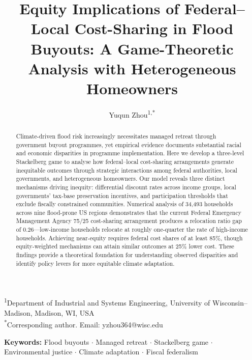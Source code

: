 \documentclass[12pt,a4paper]{article}
\title{\textbf{Equity Implications of Federal--Local Cost-Sharing in Flood Buyouts: A Game-Theoretic Analysis with Heterogeneous Homeowners}}
\author{Yuqun Zhou\textsuperscript{1,*}}
\date{}
\begin{document}
\maketitle

\noindent\textsuperscript{1}Department of Industrial and Systems Engineering, University of Wisconsin--Madison, Madison, WI, USA\\[0.5em]
\noindent\textsuperscript{*}Corresponding author. Email: yzhou364@wisc.edu

\vspace{2em}


\begin{abstract}
\noindent
Climate-driven flood risk increasingly necessitates managed retreat through government buyout programmes, yet empirical evidence documents substantial racial and economic disparities in programme implementation. Here we develop a three-level Stackelberg game to analyse how federal--local cost-sharing arrangements generate inequitable outcomes through strategic interactions among federal authorities, local governments, and heterogeneous homeowners. Our model reveals three distinct mechanisms driving inequity: differential discount rates across income groups, local governments' tax-base preservation incentives, and participation thresholds that exclude fiscally constrained communities. Numerical analysis of 34,493 households across nine flood-prone US regions demonstrates that the current Federal Emergency Management Agency 75/25 cost-sharing arrangement produces a relocation ratio gap of 0.26---low-income households relocate at roughly one-quarter the rate of high-income households. Achieving near-equity requires federal cost shares of at least 85\%, though equity-weighted mechanisms can attain similar outcomes at 25\% lower cost. These findings provide a theoretical foundation for understanding observed disparities and identify policy levers for more equitable climate adaptation.
\end{abstract}

\vspace{1em}
\noindent\textbf{Keywords:} Flood buyouts $\cdot$ Managed retreat $\cdot$ Stackelberg game $\cdot$ Environmental justice $\cdot$ Climate adaptation $\cdot$ Fiscal federalism

\newpage

\end{document}
